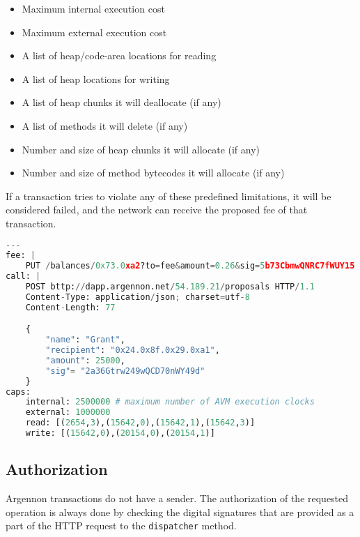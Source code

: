 \begin{itemize}
    \item Maximum internal execution cost
    \item Maximum external execution cost
    \item A list of heap/code-area locations for reading
    \item A list of heap locations for writing
    \item A list of heap chunks it will deallocate (if any)
    \item A list of methods it will delete (if any)
    \item Number and size of heap chunks it will allocate (if any)
    \item Number and size of method bytecodes it will allocate (if any)
\end{itemize}

If a transaction tries to violate any of these predefined limitations, it will be considered failed, and the network
can receive the proposed fee of that transaction.

\begin{lstlisting}[language=python, frame=TB, float, title=An Argennon transaction in YAML format,
    label={lst:txn-example}]
---
fee: |
    PUT /balances/0x73.0xa2?to=fee&amount=0.26&sig=5b73CbmwQNRC7fWUY15 HTTP/1.1
call: |
    POST bttp://dapp.argennon.net/54.189.21/proposals HTTP/1.1
    Content-Type: application/json; charset=utf-8
    Content-Length: 77

    {
        "name": "Grant",
        "recipient": "0x24.0x8f.0x29.0xa1",
        "amount": 25000,
        "sig"= "2a36Gtrw249wQCD70nWY49d"
    }
caps:
    internal: 2500000 # maximum number of AVM execution clocks
    external: 1000000
    read: [(2654,3),(15642,0),(15642,1),(15642,3)]
    write: [(15642,0),(20154,0),(20154,1)]
\end{lstlisting}

\subsection{Authorization}\label{subsec:txn-auth}

Argennon transactions do not have a sender. The authorization of the requested operation is always done by checking the
digital signatures that are provided as a part of the HTTP request to the \texttt{dispatcher} method.

